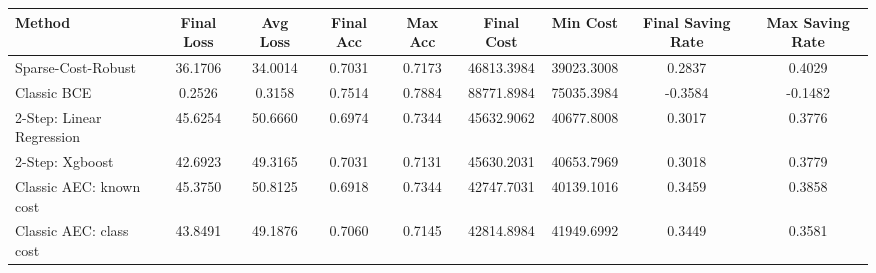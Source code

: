 \begin{tabular}{lcccccccc}
\toprule
Method & Final Loss & Avg Loss & Final Acc & Max Acc & Final Cost & Min Cost & Final Saving Rate & Max Saving Rate \\
\midrule
Sparse-Cost-Robust & 36.1706 & 34.0014 & 0.7031 & 0.7173 & 46813.3984 & 39023.3008 & 0.2837 & 0.4029 \\
Classic BCE & 0.2526 & 0.3158 & 0.7514 & 0.7884 & 88771.8984 & 75035.3984 & -0.3584 & -0.1482 \\
2-Step: Linear Regression & 45.6254 & 50.6660 & 0.6974 & 0.7344 & 45632.9062 & 40677.8008 & 0.3017 & 0.3776 \\
2-Step: Xgboost & 42.6923 & 49.3165 & 0.7031 & 0.7131 & 45630.2031 & 40653.7969 & 0.3018 & 0.3779 \\
Classic AEC: known cost & 45.3750 & 50.8125 & 0.6918 & 0.7344 & 42747.7031 & 40139.1016 & 0.3459 & 0.3858 \\
Classic AEC: class cost & 43.8491 & 49.1876 & 0.7060 & 0.7145 & 42814.8984 & 41949.6992 & 0.3449 & 0.3581 \\
\bottomrule
\end{tabular}
